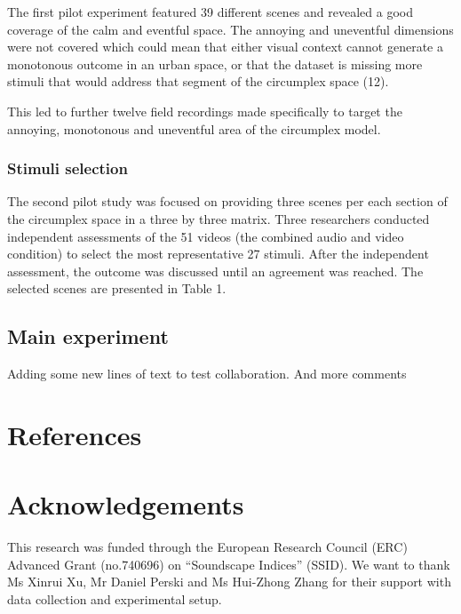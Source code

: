 \documentclass[
  authoryear,
  3p]{elsarticle}
\begin{document}
The first pilot experiment featured 39 different scenes and revealed a
good coverage of the calm and eventful space. The annoying and
uneventful dimensions were not covered which could mean that either
visual context cannot generate a monotonous outcome in an urban space,
or that the dataset is missing more stimuli that would address that
segment of the circumplex space (12).

This led to further twelve field recordings made specifically to target
the annoying, monotonous and uneventful area of the circumplex model.

\subsubsection{Stimuli selection}\label{stimuli-selection}

The second pilot study was focused on providing three scenes per each
section of the circumplex space in a three by three matrix. Three
researchers conducted independent assessments of the 51 videos (the
combined audio and video condition) to select the most representative 27
stimuli. After the independent assessment, the outcome was discussed
until an agreement was reached. The selected scenes are presented in
Table 1.

\subsection{Main experiment}\label{main-experiment}

Adding some new lines of text to test collaboration. And more comments

\section*{References}\label{references}

\printbibliography[heading=none]

\section{Acknowledgements}\label{acknowledgements}

This research was funded through the European Research Council (ERC)
Advanced Grant (no.740696) on ``Soundscape Indices'' (SSID). We want to
thank Ms Xinrui Xu, Mr Daniel Perski and Ms Hui-Zhong Zhang for their
support with data collection and experimental setup.
\end{document}

